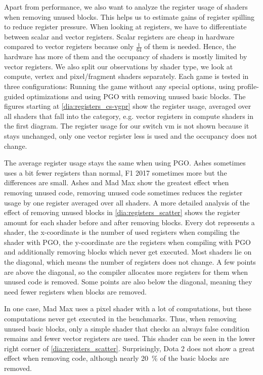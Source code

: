 Apart from performance, we also want to analyze the register usage of shaders when removing unused blocks.
This helps us to estimate gains of register spilling to reduce register pressure.
When looking at registers, we have to differentiate between scalar and vector registers.
Scalar registers are cheap in hardware compared to vector registers because only $\frac{1}{64}$ of them is needed.
Hence, the hardware has more of them and the occupancy of shaders is mostly limited by vector registers.
We also split our observations by shader type, we look at compute, vertex and pixel/fragment shaders separately.
Each game is tested in three configurations: Running the game without any special options, using profile-guided optimizations and using PGO with removing unused basic blocks.
The figures starting at \cref{dia:registers_cs-vgpr} show the register usage, averaged over all shaders that fall into the category, e.g. vector registers in compute shaders in the first diagram.
The register usage for our switch vm is not shown because it stays unchanged, only one vector register less is used and the occupancy does not change.


The average register usage stays the same when using PGO. Ashes sometimes uses a bit fewer registers than normal, F1 2017 sometimes more but the differences are small.
Ashes and Mad Max show the greatest effect when removing unused code, removing unused code sometimes reduces the register usage by one register averaged over all shaders.
A more detailed analysis of the effect of removing unused blocks in \cref{dia:registers_scatter} shows the register amount for each shader before and after removing blocks.
Every dot represents a shader, the x-coordinate is the number of used registers when compiling the shader with PGO, the y-coordinate are the registers when compiling with PGO and additionally removing blocks which never get executed.
Most shaders lie on the diagonal, which means the number of registers does not change.
A few points are above the diagonal, so the compiler allocates more registers for them when unused code is removed.
Some points are also below the diagonal, meaning they need fewer registers when blocks are removed.


In one case, Mad Max uses a pixel shader with a lot of computations, but these computations never get executed in the benchmarks.
Thus, when removing unused basic blocks, only a simple shader that checks an always false condition remains and fewer vector registers are used.
This shader can be seen in the lower right corner of \cref{dia:registers_scatter}.
Surprisingly, Dota 2 does not show a great effect when removing code, although nearly \SI{20}{\percent} of the basic blocks are removed.

